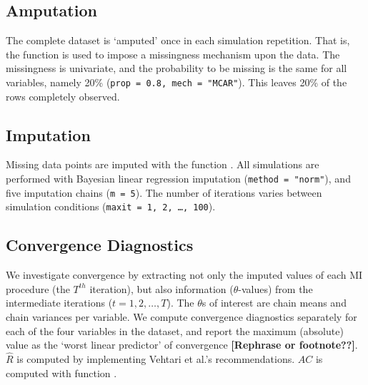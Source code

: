 \documentclass[article]{jss}
\newcommand{\fct}[1]{\code{#1()}}
\begin{document}
\subsection{Amputation}
The complete dataset is `amputed' once in each simulation repetition. That is, the  function \fct{ampute} is used to impose a missingness mechanism upon the data. The missingness is univariate, and the probability to be missing is the same for all variables, namely 20\% (\texttt{prop = 0.8, mech = "MCAR"}). This leaves 20\% of the rows completely observed. %

\subsection{Imputation}
Missing data points are imputed with the  function \fct{mice}. All simulations are performed with Bayesian linear regression imputation (\texttt{method = "norm"}), and five imputation chains (\texttt{m = 5}). The number of iterations varies between simulation conditions (\texttt{maxit = 1, 2, \dots, 100}). 

\subsection{Convergence Diagnostics}
We investigate convergence by extracting not only the imputed values of each MI procedure (the $T^{th}$ iteration), but also information ($\theta$-values) from the intermediate iterations ($t = 1, 2, \dots, T$). The $\theta$s of interest are chain means and chain variances per variable. We compute convergence diagnostics separately for each of the four variables in the dataset, and report the maximum (absolute) value as the `worst linear predictor' of convergence \textbf{[Rephrase or footnote??]}. $\widehat{R}$ is computed by implementing Vehtari et al.'s \citeyear{veht19} recommendations. $AC$ is computed with  function \fct{acf}.
\end{document}
